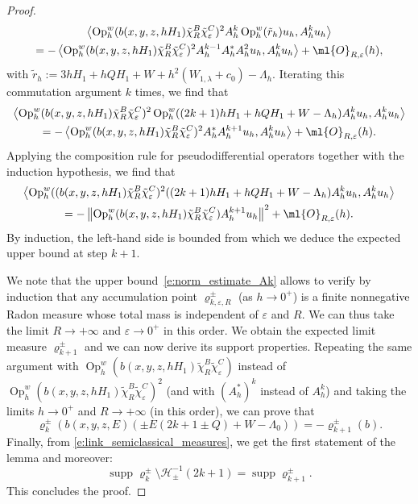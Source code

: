 \documentclass[JEP,XML,SOM,Unicode, NoEqCountersInSection,published]{cedram}
\theoremstyle{plain}
\theoremstyle{definition}
\theoremstyle{remark}
\newcommand{\Op}{\operatorname{Op}}
\begin{document}
\begin{proof}
\begin{multline*}
\left\langle \Op_h^w(b(x,y,z,hH_1)\tilde{\chi}_R^B\tilde{\chi}_\varepsilon^C)^2A_h^k\Op_h^w(\tilde{r}_h)u_h,A_h^ku_h\right\rangle \\
=-\left\langle \Op_h^w(b(x,y,z,hH_1)\tilde{\chi}_R^B\tilde{\chi}_\varepsilon^C)^2A_h^{k-1}A_h^*A_h^2 u_h,A_h^ku_h\right\rangle+ \ml{O}_{R,\varepsilon}(h),
\end{multline*}
with $\tilde{r}_h:=3hH_1+hQH_1+W+h^2(W_{1,\lambda}+c_0)-\Lambda_h$. Iterating this commutation argument $k$ times, we find that
\begin{multline*}
\left\langle \Op_h^w(b(x,y,z,hH_1)\tilde{\chi}_R^B\tilde{\chi}_\varepsilon^C)^2\Op_h^w((2k+1)hH_1+hQH_1+W-\Lambda_h) A_h^ku_h,A_h^ku_h\right\rangle \\
=-\left\langle \Op_h^w(b(x,y,z,hH_1)\tilde{\chi}_R^B\tilde{\chi}_\varepsilon^C)^2A_h^*A_h^{k+1} u_h,A_h^ku_h\right\rangle
+ \ml{O}_{R,\varepsilon}(h).
\end{multline*}
Applying the composition rule for pseudodifferential operators together with the induction hypothesis, we find that
\begin{multline*}
\left\langle \Op_h^w((b(x,y,z,hH_1)\tilde{\chi}_R^B\tilde{\chi}_\varepsilon^C)^2((2k+1)hH_1+hQH_1+W-\Lambda_h) A_h^ku_h,A_h^ku_h\right\rangle \\
=-\left\|\Op_h^w(b(x,y,z,hH_1)\tilde{\chi}_R^B\tilde{\chi}_\varepsilon^C)A_h^{k+1} u_h\right\|^2
+ \ml{O}_{R,\varepsilon}(h).
\end{multline*}
By induction, the left-hand side is bounded from which we deduce the expected upper bound at step $k+1$.

We note that the upper bound~\eqref{e:norm_estimate_Ak} allows to verify by induction that any accumulation point $\varrho_{k,\varepsilon,R}^\pm$ (as $h\to 0^+$) is a finite nonnegative Radon measure whose total mass is independent of $\varepsilon$ and $R$. We can thus take the limit $R\to +\infty$ and $\varepsilon\to 0^+$ in this order. We obtain the expected limit measure $\varrho_{k+1}^\pm$ and we can now derive its support properties. Repeating the same argument with $\Op_h^w(b(x,y,z,hH_1)\tilde{\chi}_R^B\tilde{\chi}_\varepsilon^C)$ instead of $\Op_h^w(b(x,y,z,hH_1)\tilde{\chi}_R^B\tilde{\chi}_\varepsilon^C)^2$ (and with $(A_h^*)^k$ instead of $A_h^k$) and taking the limits $h\to 0^+$ and $R\to +\infty$ (in this order), we can prove that
\begin{equation}
\label{e:link_semiclassical_measures}
\varrho_{k}^{\pm}\left(b(x,y,z,E)(\pm E(2k+1 \pm Q)+W-\Lambda_0)\right)= - \varrho^\pm_{k+1}(b).
\end{equation}
Finally, from \eqref{e:link_semiclassical_measures}, we get the first statement of the lemma and moreover:
\[
\operatorname{supp} \varrho_{k}^{\pm} \setminus \mathcal{H}_\pm^{-1}(2k+1) = \operatorname{supp} \varrho_{k+1}^{\pm}.
\]
This concludes the proof.
\end{proof}
\end{document}
